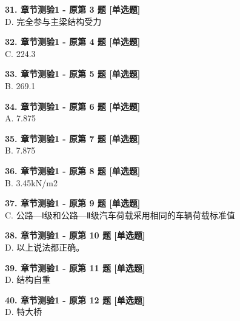 \documentclass[UTF8,zihao=-4,openany]{ctexbook}
\begin{document}
\begin{answerline}
\textbf{31. 章节测验1 - 原第 3 题 [单选题]}\\
D. 完全参与主梁结构受力
\end{answerline}

\begin{answerline}
\textbf{32. 章节测验1 - 原第 4 题 [单选题]}\\
C. 224.3
\end{answerline}

\begin{answerline}
\textbf{33. 章节测验1 - 原第 5 题 [单选题]}\\
B. 269.1
\end{answerline}

\begin{answerline}
\textbf{34. 章节测验1 - 原第 6 题 [单选题]}\\
A. 7.875
\end{answerline}

\begin{answerline}
\textbf{35. 章节测验1 - 原第 7 题 [单选题]}\\
B. 7.875
\end{answerline}

\begin{answerline}
\textbf{36. 章节测验1 - 原第 8 题 [单选题]}\\
B. 3.45kN/m2
\end{answerline}

\begin{answerline}
\textbf{37. 章节测验1 - 原第 9 题 [单选题]}\\
C. 公路—Ⅰ级和公路—Ⅱ级汽车荷载采用相同的车辆荷载标准值
\end{answerline}

\begin{answerline}
\textbf{38. 章节测验1 - 原第 10 题 [单选题]}\\
D. 以上说法都正确。
\end{answerline}

\begin{answerline}
\textbf{39. 章节测验1 - 原第 11 题 [单选题]}\\
D. 结构自重
\end{answerline}

\begin{answerline}
\textbf{40. 章节测验1 - 原第 12 题 [单选题]}\\
D. 特大桥
\end{answerline}
\end{document}
